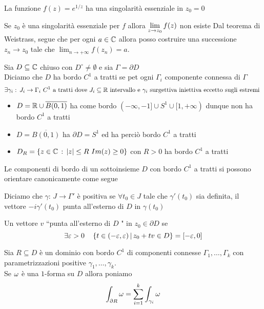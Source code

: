 \begin{ese}La funzione $f(z) =e^{1/z}$ ha una singolarit\`a essenziale in $z_0=0$
\end{ese}
\begin{cor}Se $z_0$ \`e una singolarit\`a essenziale per $f$ allora $\displaystyle \lim_{z\to z_0} f(z) $ non esiste 
\proof Dal teorema di Weistrass, segue che per ogni  $a\in \mathbb{C}$ allora posso costruire una successione $z_n\to z_0$ tale che $\lim_{n\to +\infty} f(z_n)=a$.
\end{cor}
\newpage
\begin{defn}Sia $D\subseteq\mathbb{C}$ chiuso con $D^\circ\neq \emptyset$  e sia $\Gamma=\partial D $\\
Diciamo che $D$ ha bordo $C^1$ a tratti se pet ogni $ \Gamma_i$  componente connessa di  $ \Gamma $
$$\exists \gamma_i:\, J_ i\to \Gamma_i  \, \, C^1 \text{ a tratti  dove } J_i \subseteq \mathbb{R} \text{ intervallo e } \gamma_i \text{ surgettiva  iniettiva eccetto sugli estremi } $$
\end{defn}
\begin{ese}\bbianco
\begin{itemize}
\item $D=\mathbb{R}\cup \overline{B(0,1)}$ ha come bordo $(-\infty,-1]\cup S^1 \cup[1,+\infty)$ dunque non ha bordo $C^1$ a tratti
\item $D=\overline{B(0,1)}$ ha $\partial D =S^1$ ed ha perci\`o bordo $C^1$  a tratti
\item $D_R=\left\{  z\in \mathbb{C}\, : \, \left\vert z \right\vert \leq R \, \, Im(z)\geq 0  \right\}$ con $R>0$ ha bordo $C^1$ a tratti
\end{itemize}
\end{ese}
Le componenti di bordo di un sottoinsieme $D$ con bordo $C^1$ a tratti si possono orientare canonicamente come segue
\begin{defn}Diciamo che 
$ \gamma:\, J \to \Gamma' $ \`e positiva se $ \forall t_0\in J $ tale che $\gamma'(t_0)$ sia definita, il vettore $-i\gamma'(t_0)$ punta all'esterno di $D$ in $\gamma(t_0)$
\end{defn}
\begin{defn}Un vettore $v$ ``punta all'esterno di $D$ " in $z_0\in \partial D$ se $$\exists\varepsilon>0\quad  \left\{ t\in (-\varepsilon, \varepsilon) \, \vert \, z_0 + tv\in D  \right\} =[-\varepsilon, 0]$$
\end{defn}
\begin{defn}Sia $R\subseteq D$ \`e un dominio con bordo $C^1$ di componenti connesse $\Gamma_1, \dots, \Gamma_k$ con parametrizzazioni positive $\gamma_1, \dots, \gamma_k$.\\
Se $\omega$ \`e una $1$-forma su $D$ allora poniamo 
$$ \int_{\partial R } \omega = \sum_{i=1}^ k \int_{\gamma_i} \omega $$
\end{defn}
